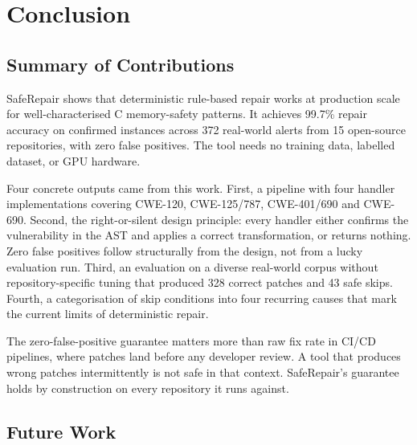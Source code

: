 \chapter{Conclusion}
\label{chap:conclusion}

\section{Summary of Contributions}

SafeRepair shows that deterministic rule-based repair works at production scale for well-char\-acterised C memory-safety patterns. It achieves 99.7\% repair accuracy on confirmed instances across 372 real-world alerts from 15 open-source repositories, with zero false positives. The tool needs no training data, labelled dataset, or GPU hardware.

Four concrete outputs came from this work. First, a pipeline with four handler implementations covering CWE-120, CWE-125/787, CWE-401/690 and CWE-690. Second, the right-or-silent design principle: every handler either confirms the vulnerability in the AST and applies a correct transformation, or returns nothing. Zero false positives follow structurally from the design, not from a lucky evaluation run. Third, an evaluation on a diverse real-world corpus without repository-specific tuning that produced 328 correct patches and 43 safe skips. Fourth, a categorisation of skip conditions into four recurring causes that mark the current limits of deterministic repair.

The zero-false-positive guarantee matters more than raw fix rate in CI/CD pipelines, where patches land before any developer review. A tool that produces wrong patches intermittently is not safe in that context. SafeRepair's guarantee holds by construction on every repository it runs against.

\section{Future Work}

